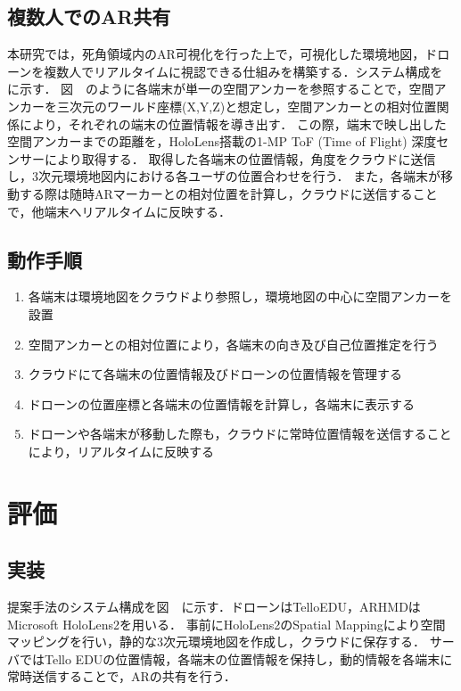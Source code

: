 \documentclass[a4paper,10pt,twocolumn,uplatex]{jsarticle}
\begin{document}
\subsection{複数人でのAR共有}
本研究では，死角領域内のAR可視化を行った上で，可視化した環境地図，ドローンを複数人でリアルタイムに視認できる仕組みを構築する．システム構成を　に示す．
図　のように各端末が単一の空間アンカーを参照することで，空間アンカーを三次元のワールド座標(X,Y,Z)と想定し，空間アンカーとの相対位置関係により，それぞれの端末の位置情報を導き出す．
この際，端末で映し出した空間アンカーまでの距離を，HoloLens搭載の1-MP ToF (Time of Flight) 深度センサーにより取得する．
取得した各端末の位置情報，角度をクラウドに送信し，3次元環境地図内における各ユーザの位置合わせを行う．
また，各端末が移動する際は随時ARマーカーとの相対位置を計算し，クラウドに送信することで，他端末へリアルタイムに反映する．

\subsection{動作手順}
\begin{enumerate}
  \item 各端末は環境地図をクラウドより参照し，環境地図の中心に空間アンカーを設置
  \item 空間アンカーとの相対位置により，各端末の向き及び自己位置推定を行う
  \item クラウドにて各端末の位置情報及びドローンの位置情報を管理する
  \item ドローンの位置座標と各端末の位置情報を計算し，各端末に表示する
  \item ドローンや各端末が移動した際も，クラウドに常時位置情報を送信することにより，リアルタイムに反映する
\end{enumerate}



\section{評価}\label{experiment}
\subsection{実装}
提案手法のシステム構成を図　に示す．ドローンはTelloEDU，ARHMDはMicrosoft HoloLens2を用いる．
事前にHoloLens2のSpatial Mappingにより空間マッピングを行い，静的な3次元環境地図を作成し，クラウドに保存する．
サーバではTello EDUの位置情報，各端末の位置情報を保持し，動的情報を各端末に常時送信することで，ARの共有を行う．
\end{document}
